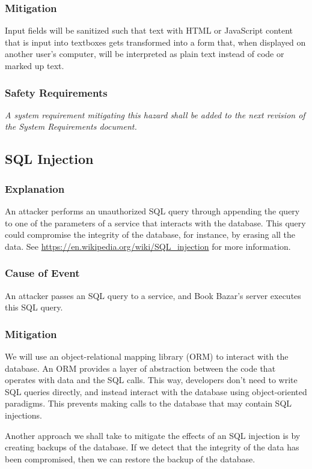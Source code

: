 \documentclass[fullpage]{article}
\begin{document}
\subsubsection*{Mitigation}
Input fields will be sanitized such that text with HTML or JavaScript content that is input into textboxes gets transformed into a form that, when displayed on another user's computer, will be interpreted as plain text instead of code or marked up text.

\subsubsection*{Safety Requirements}
\emph{A system requirement mitigating this hazard shall be added to the next revision of the System Requirements document.}

\subsection{SQL Injection}

\subsubsection*{Explanation}
An attacker performs an unauthorized SQL query through appending the query to one of the parameters of a service that interacts with the database. This query could compromise the integrity of the database, for instance, by erasing all the data. See \url{https://en.wikipedia.org/wiki/SQL_injection} for more information.

\subsubsection*{Cause of Event}
An attacker passes an SQL query to a service, and Book Bazar’s server executes this SQL query.

\subsubsection*{Mitigation}
We will use an object-relational mapping library (ORM) to interact with the database. An ORM provides a layer of abstraction between the code that operates with data and the SQL calls. This way, developers don’t need to write SQL queries directly, and instead interact with the database using object-oriented paradigms. This prevents making calls to the database that may contain SQL injections.

Another approach we shall take to mitigate the effects of an SQL injection is by creating backups of the database. If we detect that the integrity of the data has been compromised, then we can restore the backup of the database.
\end{document}
